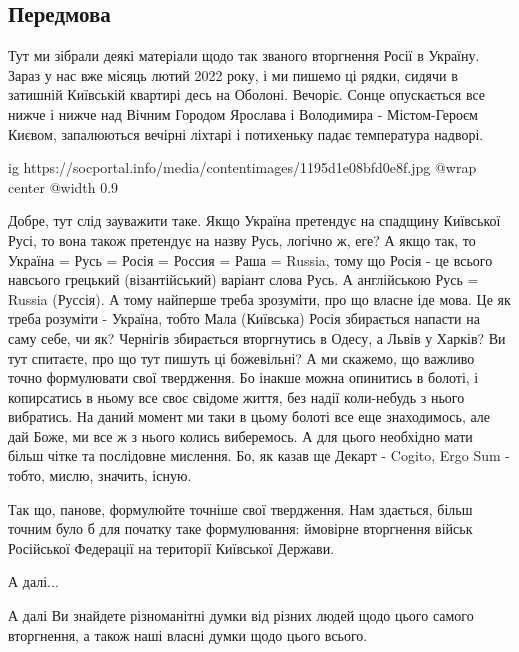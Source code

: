  
 
 
 
 
\subsection{Передмова}

Тут ми зібрали деякі матеріали щодо так званого вторгнення Росії в Україну.
Зараз у нас вже місяць лютий 2022 року, і ми пишемо ці рядки, сидячи в затишній
Київській квартирі десь на Оболоні. Вечоріє. Сонце опускається все нижче і
нижче над Вічним Городом Ярослава і Володимира - Містом-Героєм Києвом,
запалюються вечірні ліхтарі і потихеньку падає температура надворі.

\ifcmt
  ig https://socportal.info/media/contentimages/1195d1e08bfd0e8f.jpg
	@wrap center
	@width 0.9
\fi

Добре, тут слід зауважити таке. Якщо Україна претендує на спадщину Київської
Русі, то вона також претендує на назву Русь, логічно ж, еге? А якщо так, то
Україна = Русь = Росія = Россия = Раша = Russia, тому що Росія - це всього
навсього грецький (візантійський) варіант слова Русь. А англійською Русь =
Russia (Руссія). А тому найперше треба зрозуміти, про що власне іде мова. Це як
треба розуміти - Україна, тобто Мала (Київська) Росія збирається напасти на
саму себе, чи як?  Чернігів збирається вторгнутись в Одесу, а Львів у Харків?
Ви тут спитаєте, про що тут пишуть ці божевільні?  А ми скажемо, що важливо
точно формулювати свої твердження. Бо інакше можна опинитись в болоті, і
копирсатись в ньому все своє свідоме життя, без надії коли-небудь з нього
вибратись. На даний момент ми таки в цьому болоті все еще знаходимось, але дай
Боже, ми все ж з нього колись виберемось. А для цього необхідно мати більш чітке та
послідовне мислення. Бо, як казав ще Декарт - Cogito, Ergo Sum - тобто, мислю,
значить, існую.

Так що, панове, формулюйте точніше свої твердження. Нам здається, більш точним
було б для початку таке формулювання: ймовірне вторгнення військ Російської
Федерації на території Київської Держави.

А далі...

А далі Ви знайдете різноманітні думки від різних людей щодо цього самого
вторгнення, а також наші власні думки щодо цього всього.

